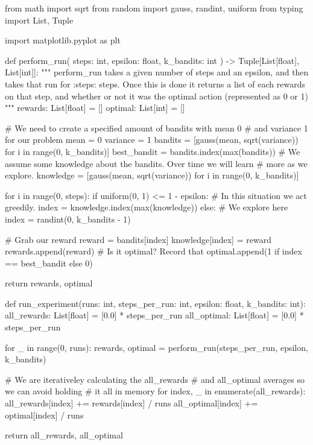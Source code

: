 \documentclass{article}
\begin{document}
\begin{python}
from math import sqrt
from random import gauss, randint, uniform
from typing import List, Tuple

import matplotlib.pyplot as plt


def perform_run(
    steps: int, epsilon: float, k_bandits: int
) -> Tuple[List[float], List[int]]:
    """
    perform_run takes a given number of steps and an epsilon, and then takes
    that run for :steps: steps. Once this is done it returns a list of each
    rewards on that step, and whether or not it was the optimal action
    (represented as 0 or 1)
    """
    rewards: List[float] = []
    optimal: List[int] = []

    # We need to create a specified amount of bandits with mean 0
    # and variance 1 for our problem
    mean = 0
    variance = 1
    bandits = [gauss(mean, sqrt(variance)) for i in range(0, k_bandits)]
    best_bandit = bandits.index(max(bandits))
    # We assume some knowledge about the bandits. Over time we will learn
    # more as we explore.
    knowledge = [gauss(mean, sqrt(variance)) for i in range(0, k_bandits)]

    for i in range(0, steps):
        if uniform(0, 1) <= 1 - epsilon:
            # In this situation we act greedily.
            index = knowledge.index(max(knowledge))
        else:
            # We explore here
            index = randint(0, k_bandits - 1)

        # Grab our reward
        reward = bandits[index]
        knowledge[index] = reward
        rewards.append(reward)
        # Is it optimal? Record that
        optimal.append(1 if index == best_bandit else 0)

    return rewards, optimal


def run_experiment(runs: int, steps_per_run: int, epsilon: float, k_bandits: int):
    all_rewards: List[float] = [0.0] * steps_per_run
    all_optimal: List[float] = [0.0] * steps_per_run

    for _ in range(0, runs):
        rewards, optimal = perform_run(steps_per_run, epsilon, k_bandits)

        # We are iterativeley calculating the all_rewards
        # and all_optimal averages so we can avoid holding
        # it all in memory
        for index, _ in enumerate(all_rewards):
            all_rewards[index] += rewards[index] / runs
            all_optimal[index] += optimal[index] / runs

    return all_rewards, all_optimal



\end{python}
\end{document}
